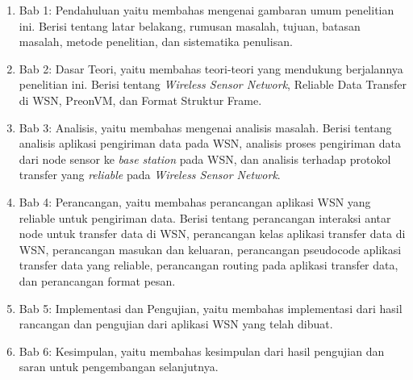 \begin{enumerate}
	\item Bab 1: Pendahuluan yaitu membahas mengenai gambaran umum penelitian ini. Berisi tentang latar belakang, rumusan masalah, tujuan, batasan masalah, metode penelitian, dan sistematika penulisan.
	\item Bab 2: Dasar Teori, yaitu membahas teori-teori yang mendukung berjalannya penelitian ini. Berisi tentang \textit{Wireless Sensor Network}, Reliable Data Transfer di WSN, PreonVM, dan Format Struktur Frame.
	\item Bab 3: Analisis, yaitu membahas mengenai analisis masalah. Berisi tentang analisis aplikasi pengiriman data pada WSN, analisis proses pengiriman data dari node sensor ke \textit{base station} pada WSN, dan analisis terhadap protokol transfer yang \textit{reliable} pada \textit{Wireless Sensor Network}.
	\item Bab 4: Perancangan, yaitu membahas perancangan aplikasi WSN yang reliable untuk pengiriman data. Berisi tentang perancangan interaksi antar node untuk transfer data di WSN, perancangan kelas aplikasi transfer data di WSN, perancangan masukan dan keluaran, perancangan pseudocode aplikasi transfer data yang reliable, perancangan routing pada aplikasi transfer data, dan perancangan format pesan.
	\item Bab 5: Implementasi dan Pengujian, yaitu membahas implementasi dari hasil rancangan dan pengujian dari aplikasi WSN yang telah dibuat.
	\item Bab 6: Kesimpulan, yaitu membahas kesimpulan dari hasil pengujian dan saran untuk pengembangan selanjutnya.
\end{enumerate}